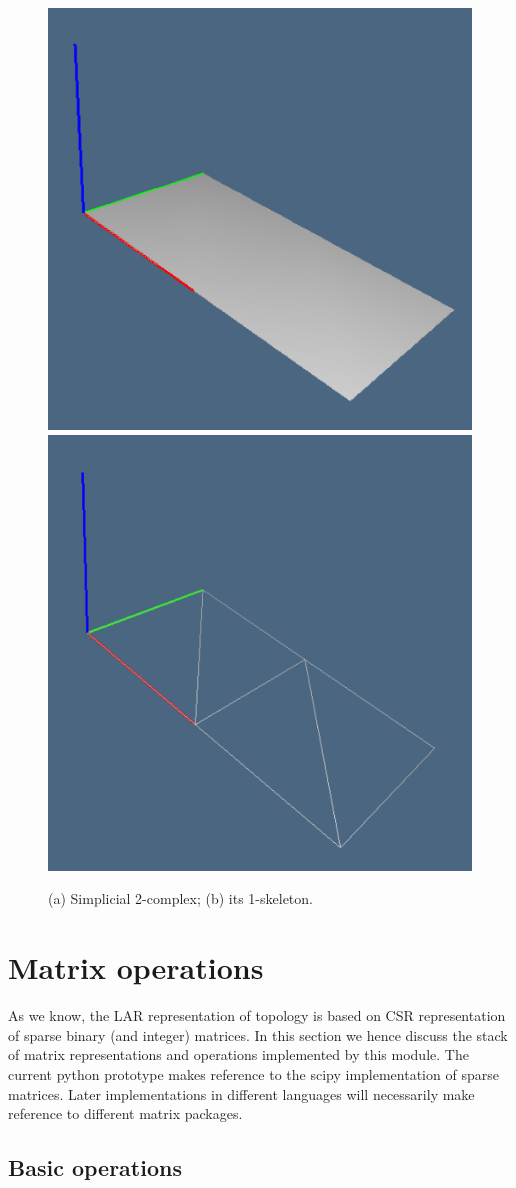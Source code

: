\documentclass[11pt,oneside]{article}    %
\begin{document}
\begin{figure}[htbp] %
   \centering
   \includegraphics[height=0.25\linewidth,width=0.25\linewidth]{images/larcc1a} 
   \includegraphics[height=0.25\linewidth,width=0.25\linewidth]{images/larcc1b} 
   \caption{(a) Simplicial 2-complex; (b) its 1-skeleton.}
   \label{fig:2D-non-manifold}
\end{figure}

\section{Matrix operations}

As we know, the LAR representation of topology is based on CSR representation of sparse binary (and integer) matrices. In this section we hence discuss the stack of matrix representations and operations implemented by this module.  The current python prototype makes reference to the scipy implementation of sparse matrices. Later implementations in different languages will necessarily make reference to different matrix packages.


\subsection{Basic operations}
\end{document}
